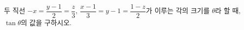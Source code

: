 두 직선 $-x=\dfrac{y-1}{2}=\dfrac{z}{3}$, $\dfrac{x-1}{3}=y-1=\dfrac{1-z}{2}$가 이루는 각의 크기를 $\theta$라 할 때, $\tan\theta$의 값을 구하시오.

